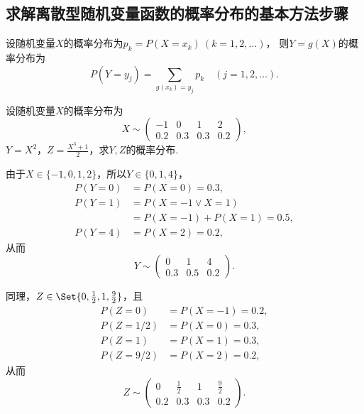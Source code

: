 \subsection{求解离散型随机变量函数的概率分布的基本方法步骤}
设随机变量\(X\)的概率分布为\(p_k = P(X = x_k)\ (k=1,2,\dotsc)\)，
则\(Y = g(X)\)的概率分布为\[
P(Y = y_j) = \sum\limits_{g(x_k) = y_j} p_k
\quad(j=1,2,\dotsc).
\]

\begin{example}
设随机变量\(X\)的概率分布为\[
X \sim \begin{pmatrix}
-1 & 0 & 1 & 2 \\
0.2 & 0.3 & 0.3 & 0.2
\end{pmatrix},
\]\(Y=X^2\)，\(Z=\frac{X^3+1}{2}\)，求\(Y,Z\)的概率分布.
\begin{solution}
由于\(X\in\{-1,0,1,2\}\)，所以\(Y\in\{0,1,4\}\)，\begin{align*}
P(Y=0) &= P(X=0) = 0.3, \\
P(Y=1) &= P(X=-1 \lor X=1) \\
	&= P(X=-1) + P(X=1)
	= 0.5, \\
P(Y=4) &= P(X=2) = 0.2,
\end{align*}
从而\[
Y \sim \begin{pmatrix}
0 & 1 & 4 \\
0.3 & 0.5 & 0.2
\end{pmatrix}.
\]

同理，\(Z\in\Set{0,\frac{1}{2},1,\frac{9}{2}}\)，且\begin{align*}
P(Z=0) &= P(X=-1) = 0.2, \\
P(Z=1/2) &= P(X=0) = 0.3, \\
P(Z=1) &= P(X=1) = 0.3, \\
P(Z=9/2) &= P(X=2) = 0.2,
\end{align*}
从而\[
Z \sim \begin{pmatrix}
0 & \frac{1}{2} & 1 & \frac{9}{2} \\
0.2 & 0.3 & 0.3 & 0.2
\end{pmatrix}.
\]
\end{solution}
\end{example}

